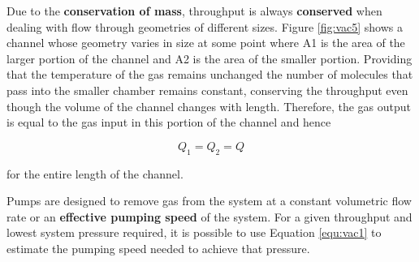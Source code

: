 \begin{marginfigure}
\caption{}
\label{fig:vac5}
\end{marginfigure}

Due to the {\bf conservation of mass}, throughput is always {\bf conserved} when dealing with flow through geometries of different sizes. Figure \ref{fig:vac5} shows a channel whose geometry varies in size at some point where A1 is the area of the larger portion of the channel and A2 is the area of the smaller portion. Providing that the temperature of the gas remains unchanged the number of molecules that pass into the smaller chamber remains constant, conserving the throughput even though the volume of the channel changes with length. Therefore, the gas output is equal to the gas input in this portion of the channel and hence

\begin{equation}
Q_1=Q_2=Q
\label{equ:vac2}
\end{equation}

\noindent for the entire length of the channel.

\begin{marginfigure}
\caption{}
\label{fig:vac6}
\end{marginfigure}

Pumps are designed to remove gas from the system at a constant volumetric flow rate or an {\bf effective pumping speed} of the system. For a given throughput and lowest system pressure required, it is possible to use Equation \ref{equ:vac1} to estimate the pumping speed needed to achieve that pressure.

